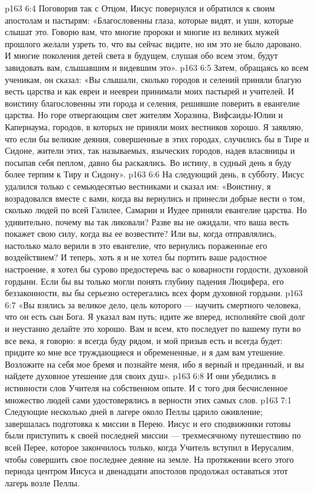 \vs p163 6:4 Поговорив так с Отцом, Иисус повернулся и обратился к своим апостолам и пастырям: «Благословенны глаза, которые видят, и уши, которые слышат это. Говорю вам, что многие пророки и многие из великих мужей прошлого желали узреть то, что вы сейчас видите, но им это не было даровано. И многие поколения детей света в будущем, слушая обо всем этом, будут завидовать вам, слышавшим и видевшим это».
\vs p163 6:5 Затем, обращаясь ко всем ученикам, он сказал: «Вы слышали, сколько городов и селений приняли благую весть царства и как евреи и неевреи принимали моих пастырей и учителей. И воистину благословенны эти города и селения, решившие поверить в евангелие царства. Но горе отвергающим свет жителям Хоразина, Вифсаиды\hyp{}Юлии и Капернаума, городов, в которых не приняли моих вестников хорошо. Я заявляю, что если бы великие деяния, совершенные в этих городах, случились бы в Тире и Сидоне, жители этих, так называемых, языческих городов, надев власяницы и посыпав себя пеплом, давно бы раскаялись. Во истину, в судный день я буду более терпим к Тиру и Сидону».
\vs p163 6:6 \pc На следующий день, в субботу, Иисус удалился только с семьюдесятью вестниками и сказал им: «Воистину, я возрадовался вместе с вами, когда вы вернулись и принесли добрые вести о том, сколько людей по всей Галилее, Самарии и Иудее приняли евангелие царства. Но удивительно, почему вы так ликовали? Разве вы не ожидали, что ваша весть покажет свою силу, когда вы ее возвестите? Или вы, когда отправлялись, настолько мало верили в это евангелие, что вернулись пораженные его воздействием? И теперь, хоть я и не хотел бы портить ваше радостное настроение, я хотел бы сурово предостеречь вас о коварности гордости, духовной гордыни. Если бы вы только могли понять глубину падения Люцифера, его беззаконности, вы бы серьезно остерегались всех форм духовной гордыни.
\vs p163 6:7 «Вы взялись за великое дело, цель которого --- научить смертного человека, что он есть сын Бога. Я указал вам путь; идите же вперед, исполняйте свой долг и неустанно делайте это хорошо. Вам и всем, кто последует по вашему пути во все века, я говорю: я всегда буду рядом, и мой призыв есть и всегда будет: придите ко мне все труждающиеся и обремененные, и я дам вам утешение. Возложите на себя мое бремя и познайте меня, ибо я верный и преданный, и вы найдете духовное утешение для своих душ».
\vs p163 6:8 \pc И они убедились в истинности слов Учителя на собственном опыте. И с того дня бесчисленное множество людей сами удостоверялись в верности этих самых слов.
\vs p163 7:1 Следующие несколько дней в лагере около Пеллы царило оживление; завершалась подготовка к миссии в Перею. Иисус и его сподвижники готовы были приступить к своей последней миссии --- трехмесячному путешествию по всей Перее, которое закончилось только, когда Учитель вступил в Иерусалим, чтобы совершить свое последнее деяние на земле. На протяжении всего этого периода центром Иисуса и двенадцати апостолов продолжал оставаться этот лагерь возле Пеллы.
